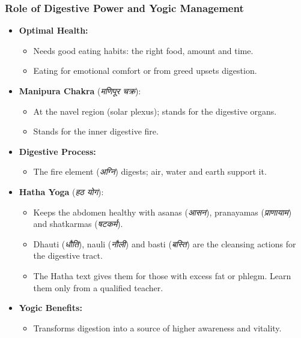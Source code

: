 \begin{frame}[fragile,shrink=6]\frametitle{Role of Digestive Power and Yogic Management}

    \begin{itemize}
        \item \textbf{Optimal Health:}
        \begin{itemize}
            \item Needs good eating habits: the right food, amount and time.
            \item Eating for emotional comfort or from greed upsets digestion.
        \end{itemize}
        \item \textbf{Manipura Chakra} (\textit{मणिपूर चक्र}):
        \begin{itemize}
            \item At the navel region (solar plexus); stands for the digestive organs.
            \item Stands for the inner digestive fire.
        \end{itemize}
        \item \textbf{Digestive Process:}
        \begin{itemize}
            \item The fire element (\textit{अग्नि}) digests; air, water and earth support it.
        \end{itemize}
        \item \textbf{Hatha Yoga} (\textit{हठ योग}):
        \begin{itemize}
            \item Keeps the abdomen healthy with asanas (\textit{आसन}), pranayamas (\textit{प्राणायाम}) and shatkarmas (\textit{षटकर्म}).
            \item Dhauti (\textit{धौति}), nauli (\textit{नौली}) and basti (\textit{बस्ति}) are the cleansing actions for the digestive tract.
            \item The Hatha text gives them for those with excess fat or phlegm. Learn them only from a qualified teacher.
        \end{itemize}
        \item \textbf{Yogic Benefits:}
        \begin{itemize}
            \item Transforms digestion into a source of higher awareness and vitality.
        \end{itemize}
    \end{itemize}

\end{frame}


